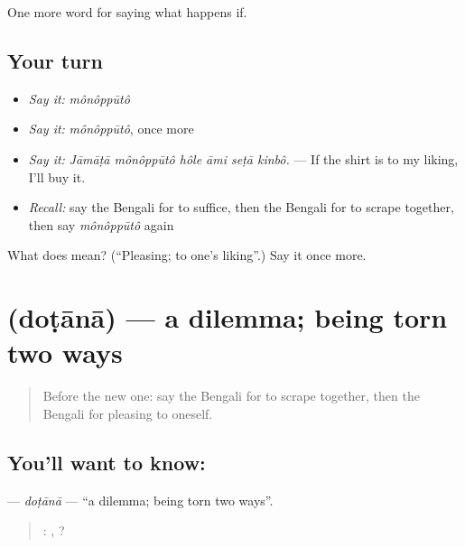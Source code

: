 \begin{grammarlens}[title={What you've built}]
One more word for saying what happens if.
\end{grammarlens}

\subsection*{Your turn}
\begin{itemize}
\raggedright
  \item \emph{Say it:} \emph{mônôppūtô}
  \item \emph{Say it:} \emph{mônôppūtô}, once more
  \item \emph{Say it:} \emph{Jāmāṭā mônôppūtô hôle āmi seṭā kinbô.} — If the shirt is to my liking, I'll buy it.
  \item \emph{Recall:} say the Bengali for to suffice, then the Bengali for to scrape together, then say \emph{mônôppūtô} again
\end{itemize}

\begin{tcolorbox}[breakable,colback=teal!4,colframe=teal!35!black,title={Before you move on}]
What does  mean? (\textquotedblleft{}Pleasing; to one's liking\textquotedblright{}.) Say it once more.
\end{tcolorbox}
\section[\texorpdfstring{\bn{দোটানা} (doṭānā)}{দোটানা (doṭānā)}]{ (doṭānā) — a dilemma; being torn two ways}

\label{lesson:BN-C529-dotana}



\begin{quote}
Before the new one: say the Bengali for to scrape together, then the Bengali for pleasing to oneself.
\end{quote}

\subsection*{You'll want to know: }
\textbf{} — \emph{doṭānā} — \textquotedblleft{}a dilemma; being torn two ways\textquotedblright{}.

\begin{quote}
  :  ,   ?
\end{quote}

